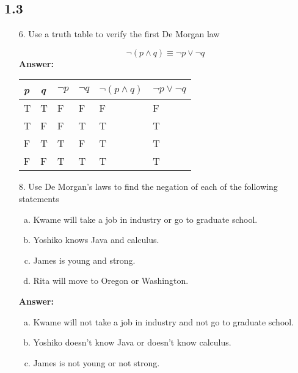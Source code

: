 \subsection{1.3}
\begin{itemize}
    \item[6.]Use a truth table to verify the first De Morgan law

          \[
              \neg (p \land q) \equiv \neg p \lor \neg q
          \]
          \textbf{Answer:}
          \begin{longtable}[c]{|l|l|l|l|l|l|}
              \hline
              \textit{p} & \textit{q} & $\neg p$ & $\neg q$ & $\neg (p \land q)$ & $\neg p \lor \neg q$ \\
              \hline
              \endfirsthead
              T          & T          & F        & F        & F                  & F                    \\
              \hline
              T          & F          & F        & T        & T                  & T                    \\
              \hline
              F          & T          & T        & F        & T                  & T                    \\
              \hline
              F          & F          & T        & T        & T                  & T                    \\
              \hline
          \end{longtable}
    \item[8.]Use De Morgan’s laws to find the negation of each of the following statements
          \begin{enumerate}[a.]
              \item Kwame will take a job in industry or go to graduate school.
              \item Yoshiko knows Java and calculus.
              \item James is young and strong.
              \item Rita will move to Oregon or Washington.
          \end{enumerate}
          \textbf{Answer:}
          \begin{enumerate}[a.]
              \item Kwame will not take a job in industry and not go to graduate school.
              \item Yoshiko doesn’t know Java or doesn’t know calculus.
              \item James is not young or not strong.

\end{enumerate}
\end{itemize}
